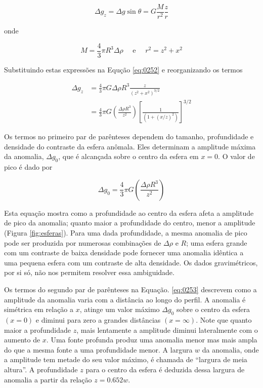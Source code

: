 \documentclass[]{book}
\theoremstyle{definition}
\theoremstyle{definition}
\theoremstyle{definition}
\theoremstyle{remark}
\begin{document}
\begin{equation}
\Delta g_{z}=\Delta g \sin \theta=G \frac{M}{r^{2}} \frac{z}{r}  \label{eq:0252}
\end{equation}

onde

\[ M=\frac{4}{3} \pi R^{3} \Delta \rho \quad \text { e } \quad r^{2}=z^{2}+x^{2}\]

Substituindo estas expressões na Equção \eqref{eq:0252} e reorganizando os termos

\begin{equation}
\begin{aligned} \Delta g_{z} &=\frac{4}{3} \pi G \Delta \rho R^{3} \frac{z}{\left(z^{2}+x^{2}\right)^{3 / 2}} \\ &=\frac{4}{3} \pi G\left(\frac{\Delta \rho R^{3}}{z^{2}}\right)\left[\frac{1}{\left(1+(x / z)^{2}\right)}\right]^{3 / 2} \end{aligned} \label{eq:0253}
\end{equation}

Os termos no primeiro par de parênteses dependem do tamanho, profundidade e densidade do contraste da esfera anômala. Eles determinam a amplitude máxima da anomalia, \(\Delta g_0\), que é alcançada sobre o centro da esfera em \(x=0\). O valor de pico é dado por

\begin{equation}
\Delta g_{0}=\frac{4}{3} \pi G\left(\frac{\Delta \rho R^{3}}{z^{2}}\right) \label{eq:0254}
\end{equation}

Esta equação mostra como a profundidade ao centro da esfera afeta a amplitude de pico da anomalia; quanto maior a profundidade do centro, menor a amplitude (Figura \ref{fig:esferas}). Para uma dada profundidade, a mesma anomalia de pico pode ser produzida por numerosas combinações de \(\Delta \rho\) e \(R\); uma esfera grande com um contraste de baixa densidade pode fornecer uma anomalia idêntica a uma pequena esfera com um contraste de alta densidade. Os dados gravimétricos, por si só, não nos permitem resolver essa ambiguidade.

Os termos do segundo par de parênteses na Equação. \eqref{eq:0253} descrevem como a amplitude da anomalia varia com a distância ao longo do perfil. A anomalia é simétrica em relação a \(x\), atinge um valor máximo \(\Delta g_0\) sobre o centro da esfera \((x=0)\) e diminui para zero a grandes distâncias \((x=\infty)\). Note que quanto maior a profundidade \(z\), mais lentamente a amplitude diminui lateralmente com o aumento de \(x\). Uma fonte profunda produz uma anomalia menor mas mais ampla do que a mesma fonte a uma profundidade menor. A largura \(w\) da anomalia, onde a amplitude tem metade do seu valor máximo, é chamada de ``largura de meia altura''. A profundidade \(z\) para o centro da esfera é deduzida dessa largura de anomalia a partir da relação \(z=0.652w\).
\end{document}
